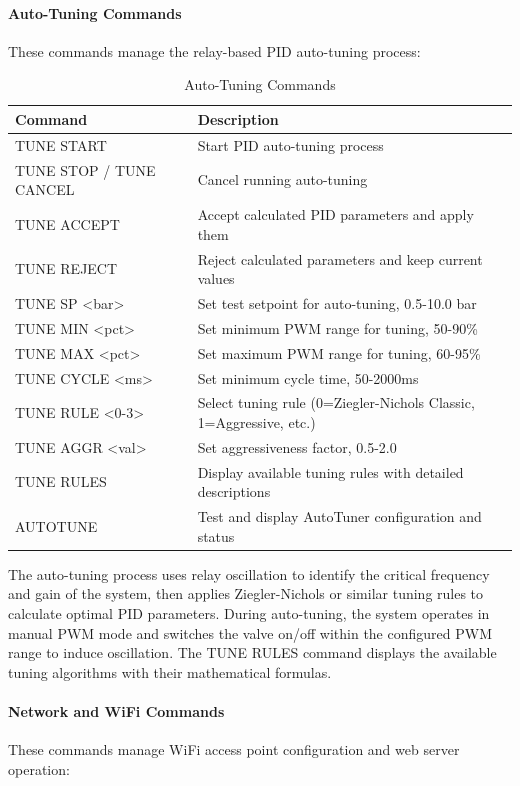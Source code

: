 \documentclass[12pt,a4paper]{article}
\begin{document}
\paragraph{Auto-Tuning Commands}
These commands manage the relay-based PID auto-tuning process:

\begin{table}[H]
\centering
\begin{tabular}{@{}ll@{}}
\toprule
\textbf{Command} & \textbf{Description} \\
\midrule
TUNE START & Start PID auto-tuning process \\
TUNE STOP / TUNE CANCEL & Cancel running auto-tuning \\
TUNE ACCEPT & Accept calculated PID parameters and apply them \\
TUNE REJECT & Reject calculated parameters and keep current values \\
TUNE SP <bar> & Set test setpoint for auto-tuning, 0.5-10.0 bar \\
TUNE MIN <pct> & Set minimum PWM range for tuning, 50-90\% \\
TUNE MAX <pct> & Set maximum PWM range for tuning, 60-95\% \\
TUNE CYCLE <ms> & Set minimum cycle time, 50-2000ms \\
TUNE RULE <0-3> & Select tuning rule (0=Ziegler-Nichols Classic, 1=Aggressive, etc.) \\
TUNE AGGR <val> & Set aggressiveness factor, 0.5-2.0 \\
TUNE RULES & Display available tuning rules with detailed descriptions \\
AUTOTUNE & Test and display AutoTuner configuration and status \\
\bottomrule
\end{tabular}
\caption{Auto-Tuning Commands}
\end{table}

The auto-tuning process uses relay oscillation to identify the critical frequency and gain of the system, then applies Ziegler-Nichols or similar tuning rules to calculate optimal PID parameters. During auto-tuning, the system operates in manual PWM mode and switches the valve on/off within the configured PWM range to induce oscillation. The TUNE RULES command displays the available tuning algorithms with their mathematical formulas.

\paragraph{Network and WiFi Commands}
These commands manage WiFi access point configuration and web server operation:
\end{document}
